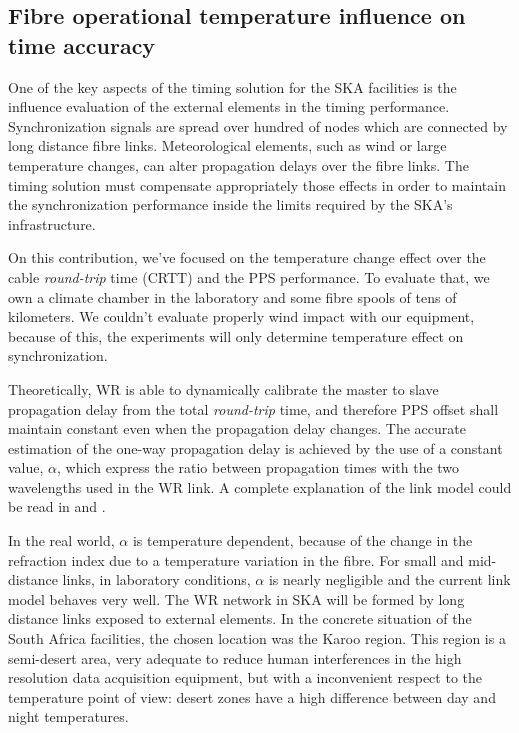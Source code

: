 \subsection{Fibre operational temperature influence on time accuracy}
\label{subsec:temp}

One of the key aspects of the timing solution for the SKA facilities is the 
influence evaluation of the external elements in the timing performance. 
Synchronization signals are spread over hundred of nodes which are connected by 
long distance fibre links. Meteorological elements, such as wind or large 
temperature changes, can alter propagation delays over the fibre 
links. The timing solution must compensate appropriately those effects in order 
to maintain the synchronization performance inside the limits required by the 
SKA's infrastructure.

On this contribution, we've focused on the temperature change effect over the 
cable
\textit{round-trip} time (CRTT) and the PPS performance. To evaluate that, we 
own a climate chamber in the laboratory and some fibre spools of tens of 
kilometers. 
We couldn't evaluate properly wind impact with our equipment, because of this, 
the experiments will only determine temperature effect on synchronization.

Theoretically, WR is able to dynamically calibrate the master to slave 
propagation delay from the total \textit{round-trip} time, and therefore PPS 
offset shall maintain constant even when the propagation delay changes. The 
accurate estimation of the one-way propagation delay is achieved by the use of 
a constant value, $\alpha$, which express the ratio between propagation times 
with the two wavelengths used in the WR link. A complete explanation of the 
link model could be read in \cite{Wlostowski2011} and \cite{Daniluk2012}.

In the real world, $\alpha$ is temperature dependent, because of the change in 
the refraction index due to a temperature variation in the fibre. For small and 
mid-distance links, in laboratory conditions, $\alpha$ is nearly negligible and 
the current link model behaves very well. The WR network in SKA will be formed 
by long distance links exposed to external elements. In the concrete situation 
of the South Africa facilities, the chosen location was the Karoo region. 
This region is a semi-desert area, very adequate to reduce human interferences 
in the high resolution data acquisition equipment, but with a inconvenient 
respect to the temperature point of view: desert zones have a high difference 
between day and night temperatures.

